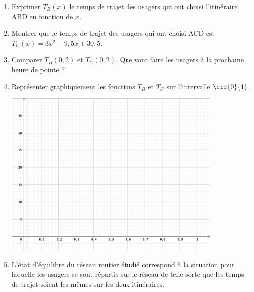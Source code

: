 \documentclass[a4paper,11pt,exos]{nsi} %
\begin{document}
\begin{enumerate}
    \item Exprimer $T_B(x)$ le temps de trajet des usagers qui ont choisi l’itinéraire ABD en fonction de $x$.\\[.5em]
    \item Montrer que le temps de trajet des usagers qui ont choisi ACD est $T_C(x)=3x^2-9,5x+30,5$.\\[.5em]
    \item Comparer $T_B(0,2)$ et $T_C(0,2)$. Que vont faire les usagers à la prochaine heure de pointe ?\\[.5em]
    \item \faCalculator \hspace*{0.2cm} Représenter graphiquement les fonctions $T_B$ et $T_C$ sur l’intervalle $\fif{0}{1}$.
    \begin{center}
        \includegraphics[width=10.5cm]{repere.png}
    \end{center}
    \item L'état d'équilibre du réseau routier étudié correspond à la situation pour laquelle les usagers se sont répartis sur le réseau de telle sorte que les temps de trajet soient les mêmes sur les deux itinéraires. 
\end{enumerate}
\end{document}
